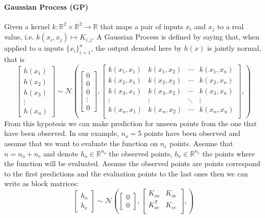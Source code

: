 \documentclass[a4paper,10pt]{article}
\newcommand{\trnsp}{\mathsf{T}}
\newcommand{\R}{\mathbb{R}}
\newcommand{\N}{\mathcal{N}}
\begin{document}
\paragraph{Gaussian Process (GP)} Given a kernel $k: \R^2 \times \R^2 \rightarrow \R$ that maps a pair of inputs $x_i$ and $x_j$ to a real value, i.e. $k(x_i, x_j) \mapsto K_{i, j}$. A Gaussian Process is defined by saying that, when applied to a inputs $\{x_i\}_{i = 1}^n$, the output denoted here by $h(x)$ is jointly normal, that is
\begin{equation}
    \begin{bmatrix}
    h(x_1) \\
    h(x_2) \\
    h(x_3)\\
    \vdots \\
    h(x_n)
    \end{bmatrix}
    \sim
    \N \left(
    \begin{bmatrix}
    0 \\
    0\\
    0 \\
    \vdots \\
    0
    \end{bmatrix},
    \begin{bmatrix}
    k(x_1, x_1) & k(x_1, x_2) & \cdots & k(x_1, x_n)\\
    k(x_2, x_1) & k(x_2, x_2) & \cdots & k(x_2, x_n)\\
    k(x_3, x_1) & k(x_3, x_2) & \cdots & k(x_3, x_n)\\
    \vdots & \vdots & \ddots & \vdots\\
    k(x_n, x_1) & k(x_n, x_2) & \cdots & k(x_n, x_n)\\
    \end{bmatrix},
    \right)
\end{equation}
From this hypotesis we can make prediction for unseen points from the one that have been observed. In our example, $n_o = 5$ points have been observed and assume that we want to evaluate the function on $n_e$ points. Assume that $n = n_{o} + n_{e}$ and denote
$h_{\text{o}} \in \R^{n_o}$ the observed points, $h_{\text{e}} \in \R^{n_e}$ the points where the function will be evaluated. Assume the observed points are points correspond to the first predictions and the evaluation points to the last ones then we can write as block matrices:
\begin{equation}
    \begin{bmatrix}
    h_{\text{o}}\\
    h_{\text{e}}
    \end{bmatrix}
    \sim
    \N \left(
    \begin{bmatrix}
    0 \\
    0
    \end{bmatrix},
    \begin{bmatrix}
    K_{oo} & K_{oe} \\
    K_{oe}^\trnsp & K_{ee} \\
    \end{bmatrix},
    \right)
\end{equation}
\end{document}
